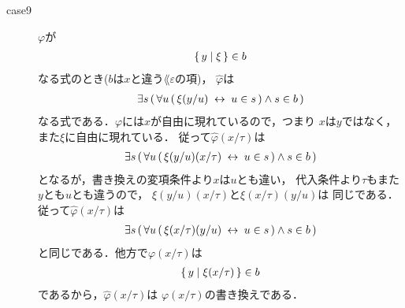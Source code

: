\begin{metaprf}[第一]
\begin{description}
\begin{description}
					\item[case9] $\varphi$が
						\begin{align}
							\{\, y \mid \xi\, \} \in b
						\end{align}
						なる式のとき($b$は$x$と違う$\lang{\varepsilon}$の項)，
						$\widehat{\varphi}$は
						\begin{align}
							\exists s\, (\, \forall u\, (\, \xi(y/u) \hspace{0.25em}\leftrightarrow\hspace{0.25em} u \in s\, ) \wedge s \in b\, )
						\end{align}
						なる式である．$\varphi$には$x$が自由に現れているので，つまり
						$x$は$y$ではなく，また$\xi$に自由に現れている．
						従って$\widehat{\varphi}(x/\tau)$は
						\begin{align}
							\exists s\, (\, \forall u\, (\, \xi(y/u)(x/\tau) \hspace{0.25em}\leftrightarrow\hspace{0.25em} u \in s\, ) \wedge s \in b\, )
						\end{align}
						となるが，書き換えの変項条件より$x$は$u$とも違い，
						代入条件より$\tau$もまた$y$とも$u$とも違うので，
						$\xi(y/u)(x/\tau)$と$\xi(x/\tau)(y/u)$は
						同じである．従って$\widehat{\varphi}(x/\tau)$は
						\begin{align}
							\exists s\, (\, \forall u\, (\, \xi(x/\tau)(y/u) \hspace{0.25em}\leftrightarrow\hspace{0.25em} u \in s\, ) \wedge s \in b\, )
						\end{align}
						と同じである．他方で$\varphi(x/\tau)$は
						\begin{align}
							\{\, y \mid \xi(x/\tau)\, \} \in b
						\end{align}
						であるから，$\widehat{\varphi}(x/\tau)$は
						$\varphi(x/\tau)$の書き換えである．
						

\end{description}
\end{description}
\end{metaprf}
